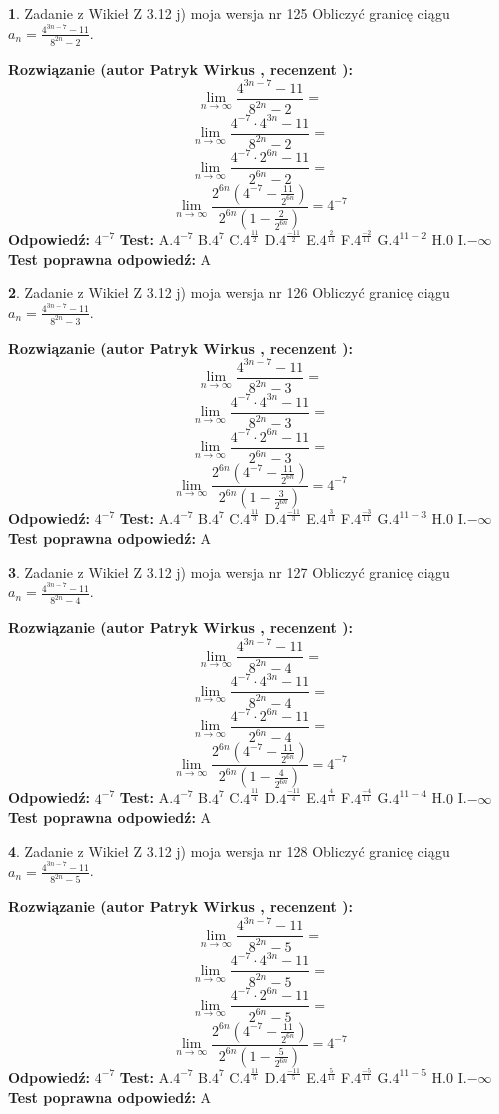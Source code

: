 \documentclass[12pt, a4paper]{article}
\theoremstyle{definition} %
\newtheorem{zad}{}
\newcommand{\zadStart}[1]{\begin{zad}#1\newline}
\newcommand{\zadStop}{\end{zad}}
\newcommand{\rozwStart}[2]{\noindent \textbf{Rozwiązanie (autor #1 , recenzent #2): }\newline}
\newcommand{\rozwStop}{\newline}
\newcommand{\odpStart}{\noindent \textbf{Odpowiedź:}\newline}
\newcommand{\odpStop}{\newline}
\newcommand{\testStart}{\noindent \textbf{Test:}\newline}
\newcommand{\testStop}{\newline}
\newcommand{\kluczStart}{\noindent \textbf{Test poprawna odpowiedź:}\newline}
\newcommand{\kluczStop}{\newline}
\begin{document}
\zadStart{Zadanie z Wikieł Z 3.12 j) moja wersja nr 125}
Obliczyć granicę ciągu $a_{n}=\frac{4^{3n-7}-11}{8^{2n}-2}$.
\zadStop
\rozwStart{Patryk Wirkus}{}
$$\lim\limits_{n\to\infty}\frac{4^{3n-7}-11}{8^{2n}-2}=$$
$$\lim\limits_{n\to\infty}\frac{4^{-7} \cdot 4^{3n}-11}{8^{2n}-2}=$$
$$\lim\limits_{n\to\infty}\frac{4^{-7} \cdot 2^{6n}-11}{2^{6n}-2}=$$
$$\lim\limits_{n\to\infty}\frac{2^{6n}(4^{-7} - \frac{11}{2^{6n}})}{2^{6n}(1-\frac{2}{2^{6n}})}= 4^{-7}$$
\rozwStop
\odpStart
$4^{-7}$
\odpStop
\testStart
A.$4^{-7}$
B.$4^{7}$
C.$4^{\frac{11}{2}}$
D.$4^{\frac{-11}{2}}$
E.$4^{\frac{2}{11}}$
F.$4^{\frac{-2}{11}}$
G.$4^{11-2}$
H.$0$
I.$-\infty$
\testStop
\kluczStart
A
\kluczStop



\zadStart{Zadanie z Wikieł Z 3.12 j) moja wersja nr 126}
Obliczyć granicę ciągu $a_{n}=\frac{4^{3n-7}-11}{8^{2n}-3}$.
\zadStop
\rozwStart{Patryk Wirkus}{}
$$\lim\limits_{n\to\infty}\frac{4^{3n-7}-11}{8^{2n}-3}=$$
$$\lim\limits_{n\to\infty}\frac{4^{-7} \cdot 4^{3n}-11}{8^{2n}-3}=$$
$$\lim\limits_{n\to\infty}\frac{4^{-7} \cdot 2^{6n}-11}{2^{6n}-3}=$$
$$\lim\limits_{n\to\infty}\frac{2^{6n}(4^{-7} - \frac{11}{2^{6n}})}{2^{6n}(1-\frac{3}{2^{6n}})}= 4^{-7}$$
\rozwStop
\odpStart
$4^{-7}$
\odpStop
\testStart
A.$4^{-7}$
B.$4^{7}$
C.$4^{\frac{11}{3}}$
D.$4^{\frac{-11}{3}}$
E.$4^{\frac{3}{11}}$
F.$4^{\frac{-3}{11}}$
G.$4^{11-3}$
H.$0$
I.$-\infty$
\testStop
\kluczStart
A
\kluczStop



\zadStart{Zadanie z Wikieł Z 3.12 j) moja wersja nr 127}
Obliczyć granicę ciągu $a_{n}=\frac{4^{3n-7}-11}{8^{2n}-4}$.
\zadStop
\rozwStart{Patryk Wirkus}{}
$$\lim\limits_{n\to\infty}\frac{4^{3n-7}-11}{8^{2n}-4}=$$
$$\lim\limits_{n\to\infty}\frac{4^{-7} \cdot 4^{3n}-11}{8^{2n}-4}=$$
$$\lim\limits_{n\to\infty}\frac{4^{-7} \cdot 2^{6n}-11}{2^{6n}-4}=$$
$$\lim\limits_{n\to\infty}\frac{2^{6n}(4^{-7} - \frac{11}{2^{6n}})}{2^{6n}(1-\frac{4}{2^{6n}})}= 4^{-7}$$
\rozwStop
\odpStart
$4^{-7}$
\odpStop
\testStart
A.$4^{-7}$
B.$4^{7}$
C.$4^{\frac{11}{4}}$
D.$4^{\frac{-11}{4}}$
E.$4^{\frac{4}{11}}$
F.$4^{\frac{-4}{11}}$
G.$4^{11-4}$
H.$0$
I.$-\infty$
\testStop
\kluczStart
A
\kluczStop



\zadStart{Zadanie z Wikieł Z 3.12 j) moja wersja nr 128}
Obliczyć granicę ciągu $a_{n}=\frac{4^{3n-7}-11}{8^{2n}-5}$.
\zadStop
\rozwStart{Patryk Wirkus}{}
$$\lim\limits_{n\to\infty}\frac{4^{3n-7}-11}{8^{2n}-5}=$$
$$\lim\limits_{n\to\infty}\frac{4^{-7} \cdot 4^{3n}-11}{8^{2n}-5}=$$
$$\lim\limits_{n\to\infty}\frac{4^{-7} \cdot 2^{6n}-11}{2^{6n}-5}=$$
$$\lim\limits_{n\to\infty}\frac{2^{6n}(4^{-7} - \frac{11}{2^{6n}})}{2^{6n}(1-\frac{5}{2^{6n}})}= 4^{-7}$$
\rozwStop
\odpStart
$4^{-7}$
\odpStop
\testStart
A.$4^{-7}$
B.$4^{7}$
C.$4^{\frac{11}{5}}$
D.$4^{\frac{-11}{5}}$
E.$4^{\frac{5}{11}}$
F.$4^{\frac{-5}{11}}$
G.$4^{11-5}$
H.$0$
I.$-\infty$
\testStop
\kluczStart
A
\kluczStop
\end{document}
